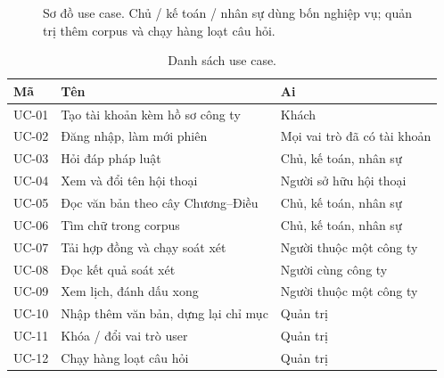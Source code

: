 \begin{figure}[htp]
\centering
\resizebox{0.95\linewidth}{!}{\hinhUseCase}
\caption{Sơ đồ use case. Chủ / kế toán / nhân sự dùng bốn nghiệp vụ; quản trị
thêm corpus và chạy hàng loạt câu hỏi.}
\label{fig:so-do-use-case}
\end{figure}

\begin{table}[htp]
\centering
\caption{Danh sách use case.}
\label{tab:danh-sach-uc}
\begin{tabular}{p{1.5cm}p{6.0cm}p{6.3cm}}
\toprule
\textbf{Mã} & \textbf{Tên} & \textbf{Ai} \\
\midrule
UC-01 & Tạo tài khoản kèm hồ sơ công ty & Khách \\
UC-02 & Đăng nhập, làm mới phiên & Mọi vai trò đã có tài khoản \\
UC-03 & Hỏi đáp pháp luật & Chủ, kế toán, nhân sự \\
UC-04 & Xem và đổi tên hội thoại & Người sở hữu hội thoại \\
UC-05 & Đọc văn bản theo cây Chương--Điều & Chủ, kế toán, nhân sự \\
UC-06 & Tìm chữ trong corpus & Chủ, kế toán, nhân sự \\
UC-07 & Tải hợp đồng và chạy soát xét & Người thuộc một công ty \\
UC-08 & Đọc kết quả soát xét & Người cùng công ty \\
UC-09 & Xem lịch, đánh dấu xong & Người thuộc một công ty \\
UC-10 & Nhập thêm văn bản, dựng lại chỉ mục & Quản trị \\
UC-11 & Khóa / đổi vai trò user & Quản trị \\
UC-12 & Chạy hàng loạt câu hỏi & Quản trị \\
\bottomrule
\end{tabular}
\end{table}

